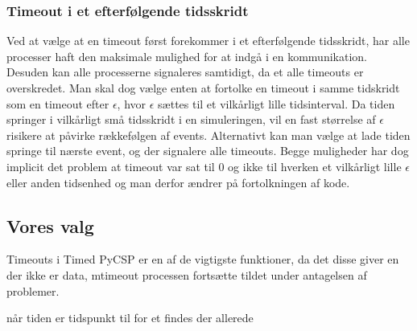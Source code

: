 \subsubsection{Timeout i et efterfølgende tidsskridt} Ved at vælge at
en timeout først forekommer i et efterfølgende tidsskridt, har alle
processer haft den maksimale mulighed for at indgå i en kommunikation.
Desuden kan alle processerne signaleres samtidigt, da et alle timeouts
er overskredet. Man skal dog vælge enten at fortolke en timeout i samme
tidskridt som en timeout efter $\epsilon$, hvor $\epsilon$ sættes til
et vilkårligt lille tidsinterval. Da tiden springer i vilkårligt små
tidsskridt i en simuleringen, vil en fast størrelse af $\epsilon$
risikere at påvirke rækkefølgen af events. Alternativt kan man vælge
at lade tiden springe til nærste event, og der signalere alle timeouts.
Begge muligheder har dog implicit det problem at timeout var sat til
0 og ikke til hverken et vilkårligt lille $\epsilon$ eller anden
tidsenhed og man derfor ændrer på fortolkningen af kode.

\subsection{Vores valg}

Timeouts i Timed PyCSP er en af de vigtigste funktioner, da det disse
giver en der ikke er data, mtimeout processen fortsætte tildet under
antagelsen af problemer.

når tiden er tidspunkt til for et findes der allerede 
